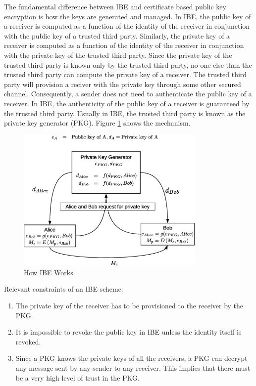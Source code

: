 \documentclass{river-journal}
\begin{document}
The fundamental difference between IBE and certificate based public key encryption is how the keys are generated and managed. In IBE, the public key of a receiver is computed as a function of the identity of the receiver in conjunction with the public key of a trusted third party. Similarly, the private key of a receiver is computed as a function of the identity of the receiver in conjunction with the private key of the trusted third party. Since the private key of the trusted third party is known only by the trusted third party, no one else than the trusted third party can compute the private key of a receiver. The trusted third party will provision a reciver with the private key through some other secured channel. Consequently, a sender does not need to authenticate the public key of a receiver. In IBE, the authenticity of the public key of a receiver is guaranteed by the trusted third party. Usually in IBE, the trusted third party is known as the private key generator (PKG). Figure \ref{fig:how_IBE_works} shows the mechanism.


\begin{figure}
\begin{center}
  \includegraphics[height=7cm]{how_IBE_works.eps}
\caption{How IBE Works}
\label{fig:how_IBE_works}       %
\end{center}
\end{figure}

Relevant constraints of an IBE scheme:
\begin{enumerate}
 \item The private key of the receiver has to be provisioned to the receiver by the PKG.
 \item It is impossible to revoke the public key in IBE unless the identity itself is revoked.
 \item Since a PKG knows the private keys of all the receivers, a PKG can decrypt any message sent by any sender to any receiver. This implies that there must be a very high level of trust in the PKG.
\end{enumerate}
\end{document}
